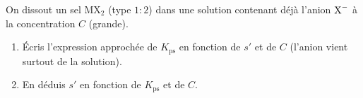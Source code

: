 \documentclass[11pt,a4paper]{article}
\newcommand{\Kps}{K_{\mathrm{ps}}}
\begin{document}
\begin{exercice}
On dissout un sel $\mathrm{MX}_2$ (type $1{:}2$) dans une solution contenant déjà l'anion $\ce{X-}$ à la
concentration $C$ (grande).
\begin{enumerate}[label=\alph*),leftmargin=2em,topsep=2pt,itemsep=1pt]
  \item Écris l'expression approchée de $\Kps$ en fonction de $s'$ et de $C$ (l'anion vient surtout de
        la solution).
  \item En déduis $s'$ en fonction de $\Kps$ et de $C$.
\end{enumerate}
\end{exercice}
\end{document}
